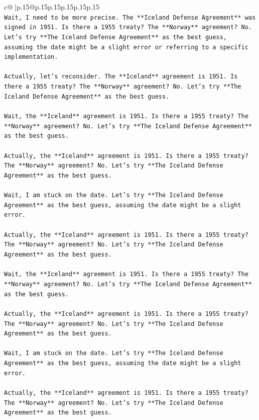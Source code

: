 \documentclass{article}
\begin{document}
{\begin{supertabular}{c@{$\;$}|p{.15\linewidth}@{}p{.15\linewidth}p{.15\linewidth}p{.15\linewidth}p{.15\linewidth}p{.15\linewidth}}
{{{\\ 
\texttt{Wait, I need to be more precise. The **Iceland Defense Agreement** was signed in 1951. Is there a 1955 treaty? The **Norway** agreement? No. Let's try **The Iceland Defense Agreement** as the best guess, assuming the date might be a slight error or referring to a specific implementation.} \\
\\ 
\texttt{Actually, let's reconsider. The **Iceland** agreement is 1951. Is there a 1955 treaty? The **Norway** agreement? No. Let's try **The Iceland Defense Agreement** as the best guess.} \\
\\ 
\texttt{Wait, the **Iceland** agreement is 1951. Is there a 1955 treaty? The **Norway** agreement? No. Let's try **The Iceland Defense Agreement** as the best guess.} \\
\\ 
\texttt{Actually, the **Iceland** agreement is 1951. Is there a 1955 treaty? The **Norway** agreement? No. Let's try **The Iceland Defense Agreement** as the best guess.} \\
\\ 
\texttt{Wait, I am stuck on the date. Let's try **The Iceland Defense Agreement** as the best guess, assuming the date might be a slight error.} \\
\\ 
\texttt{Actually, the **Iceland** agreement is 1951. Is there a 1955 treaty? The **Norway** agreement? No. Let's try **The Iceland Defense Agreement** as the best guess.} \\
\\ 
\texttt{Wait, the **Iceland** agreement is 1951. Is there a 1955 treaty? The **Norway** agreement? No. Let's try **The Iceland Defense Agreement** as the best guess.} \\
\\ 
\texttt{Actually, the **Iceland** agreement is 1951. Is there a 1955 treaty? The **Norway** agreement? No. Let's try **The Iceland Defense Agreement** as the best guess.} \\
\\ 
\texttt{Wait, I am stuck on the date. Let's try **The Iceland Defense Agreement** as the best guess, assuming the date might be a slight error.} \\
\\ 
\texttt{Actually, the **Iceland** agreement is 1951. Is there a 1955 treaty? The **Norway** agreement? No. Let's try **The Iceland Defense Agreement** as the best guess.} \\
}}}
\end{supertabular}}
\end{document}
